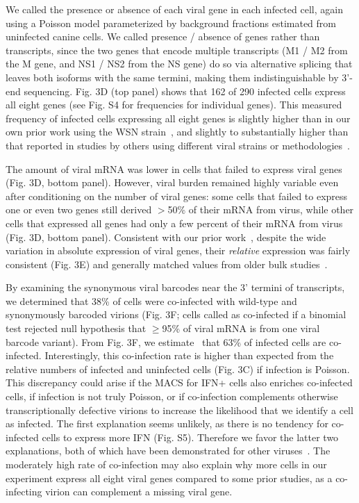 \documentclass[]{article}
\begin{document}
We called the presence or absence of each viral gene in each infected cell, again using a Poisson model parameterized by background fractions estimated from uninfected canine cells.
We called presence / absence of genes rather than transcripts, since the two genes that encode multiple transcripts (M1 / M2 from the M gene, and NS1 / NS2 from the NS gene) do so via alternative splicing that leaves both isoforms with the same termini, making them indistinguishable by 3'-end sequencing.
Fig. 3D (top panel) shows that 162 of 290 infected cells express all eight genes (see Fig. S4 for frequencies for individual genes).
This measured frequency of infected cells expressing all eight genes is slightly higher than in our own prior work using the WSN strain~\cite{russell2018extreme}, and slightly to substantially higher than that reported in studies by others using different viral strains or methodologies~\cite{heldt2015single, brooke2013most, dou2017analysis, jacobs2019incomplete}. 

The amount of viral mRNA was lower in cells that failed to express viral genes (Fig. 3D, bottom panel).
However, viral burden remained highly variable even after conditioning on the number of viral genes: some cells that failed to express one or even two genes still derived $>$50\% of their mRNA from virus, while other cells that expressed all genes had only a few percent of their mRNA from virus (Fig. 3D, bottom panel).
Consistent with our prior work~\cite{russell2018extreme}, despite the wide variation in absolute expression of viral genes, their \emph{relative} expression was fairly consistent (Fig. 3E) and generally matched values from older bulk studies~\cite{hatada1989control}.

By examining the synonymous viral barcodes near the 3' termini of transcripts, we determined that 38\% of cells were co-infected with wild-type and synonymously barcoded virions (Fig. 3F; cells called as co-infected if a binomial test rejected null hypothesis that $\ge$95\% of viral mRNA is from one viral barcode variant).
From Fig. 3F, we estimate~\cite{bloom2018estimating} that 63\% of infected cells are co-infected.
Interestingly, this co-infection rate is higher than expected from the relative numbers of infected and uninfected cells (Fig. 3C) if infection is Poisson.
This discrepancy could arise if the MACS for IFN+ cells also enriches co-infected cells, if infection is not truly Poisson, or if co-infection complements otherwise transcriptionally defective virions to increase the likelihood that we identify a cell as infected.
The first explanation seems unlikely, as there is no tendency for co-infected cells to express more IFN (Fig. S5). 
Therefore we favor the latter two explanations, both of which have been demonstrated for other viruses~\cite{aguilera2017plaques, combe2015single}.
The moderately high rate of co-infection may also explain why more cells in our experiment express all eight viral genes compared to some prior studies, as a co-infecting virion can complement a missing viral gene. 
\end{document}
